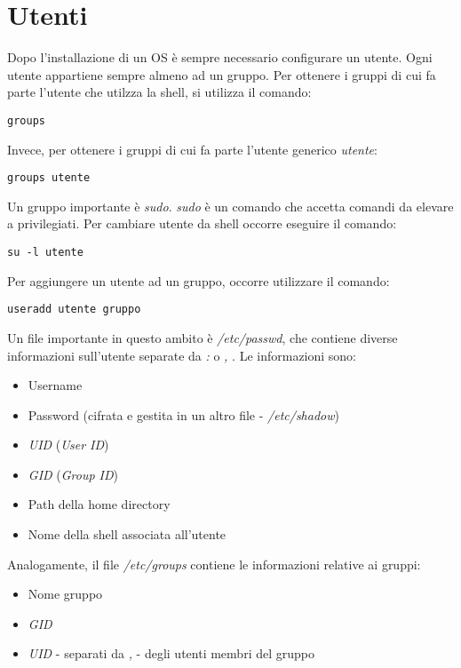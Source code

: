 \section{Utenti}
Dopo l'installazione di un OS è sempre necessario configurare un utente.
Ogni utente appartiene sempre almeno ad un gruppo.
Per ottenere i gruppi di cui fa parte l'utente che utilzza la shell, si utilizza il comando:
\begin{lstlisting}
groups
\end{lstlisting}
Invece, per ottenere i gruppi di cui fa parte l'utente generico \textit{utente}:
\begin{lstlisting}
groups utente
\end{lstlisting}
Un gruppo importante è \textit{sudo}.
\textit{sudo} è un comando che accetta comandi da elevare a privilegiati.
Per cambiare utente da shell occorre eseguire il comando:
\begin{lstlisting}
su -l utente
\end{lstlisting}
Per aggiungere un utente ad un gruppo, occorre utilizzare il comando:
\begin{lstlisting}
useradd utente gruppo
\end{lstlisting}
Un file importante in questo ambito è \textit{/etc/passwd}, che contiene diverse informazioni sull'utente separate da \textit{:} o \textit{,} . Le informazioni sono:
\begin{itemize}
    \item Username
    \item Password (cifrata e gestita in un altro file - \textit{/etc/shadow})
    \item \textit{UID} (\textit{User ID})
    \item \textit{GID} (\textit{Group ID})
    \item Path della home directory
    \item Nome della shell associata all'utente
\end{itemize}
Analogamente, il file \textit{/etc/groups} contiene le informazioni relative ai gruppi:
\begin{itemize}
    \item Nome gruppo
    \item \textit{GID}
    \item \textit{UID} - separati da \textit{,} - degli utenti membri del gruppo
\end{itemize}

